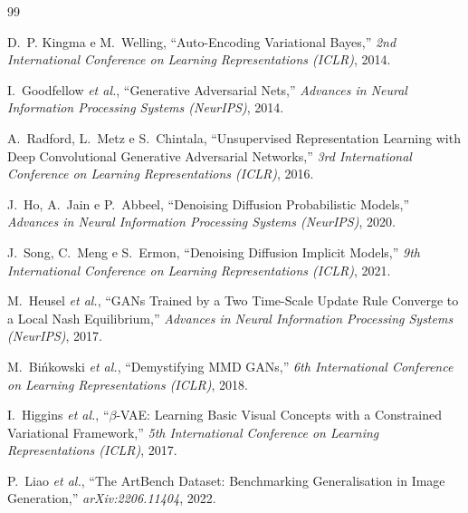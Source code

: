 \documentclass[12pt,a4paper]{article}
\begin{document}
\newpage
\begin{thebibliography}{99}

D.~P. Kingma e M.~Welling,
``Auto-Encoding Variational Bayes,''
\textit{2nd International Conference on Learning Representations (ICLR)}, 2014.

I.~Goodfellow \textit{et al.},
``Generative Adversarial Nets,''
\textit{Advances in Neural Information Processing Systems (NeurIPS)}, 2014.

A.~Radford, L.~Metz e S.~Chintala,
``Unsupervised Representation Learning with Deep Convolutional Generative
Adversarial Networks,''
\textit{3rd International Conference on Learning Representations (ICLR)}, 2016.

J.~Ho, A.~Jain e P.~Abbeel,
``Denoising Diffusion Probabilistic Models,''
\textit{Advances in Neural Information Processing Systems (NeurIPS)}, 2020.

J.~Song, C.~Meng e S.~Ermon,
``Denoising Diffusion Implicit Models,''
\textit{9th International Conference on Learning Representations (ICLR)}, 2021.

M.~Heusel \textit{et al.},
``GANs Trained by a Two Time-Scale Update Rule Converge to a Local Nash
Equilibrium,''
\textit{Advances in Neural Information Processing Systems (NeurIPS)}, 2017.

M.~Bińkowski \textit{et al.},
``Demystifying MMD GANs,''
\textit{6th International Conference on Learning Representations (ICLR)}, 2018.

I.~Higgins \textit{et al.},
``$\beta$-VAE: Learning Basic Visual Concepts with a Constrained Variational
Framework,''
\textit{5th International Conference on Learning Representations (ICLR)}, 2017.

P.~Liao \textit{et al.},
``The ArtBench Dataset: Benchmarking Generalisation in Image Generation,''
\textit{arXiv:2206.11404}, 2022.

\end{thebibliography}
\end{document}
